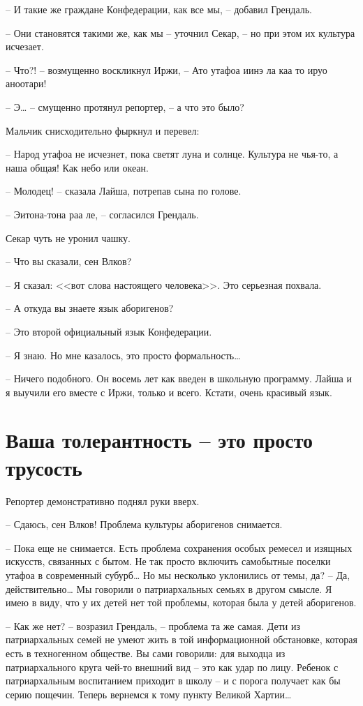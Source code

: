 -- И такие же граждане Конфедерации, как все мы, -- добавил Грендаль.

-- Они становятся такими же, как мы -- уточнил Секар, -- но при этом их культура исчезает.

-- Что?! -- возмущенно воскликнул Иржи, -- Ато утафоа иинэ ла каа то ируо аноотари!

-- Э\ldots{} -- смущенно протянул репортер, -- а что это было?

Мальчик снисходительно фыркнул и перевел:

-- Народ утафоа не исчезнет, пока светят луна и солнце. Культура не чья-то, а наша общая! Как небо или океан.

-- Молодец! -- сказала Лайша, потрепав сына по голове.

-- Эитона-тона раа ле, -- согласился Грендаль.

Секар чуть не уронил чашку.

-- Что вы сказали, сен Влков?

-- Я сказал: <<вот слова настоящего человека>>. Это серьезная похвала.

-- А откуда вы знаете язык аборигенов?

-- Это второй официальный язык Конфедерации.

-- Я знаю. Но мне казалось, это просто формальность\ldots{}

-- Ничего подобного. Он восемь лет как введен в школьную программу. Лайша и я выучили его вместе с Иржи, только и всего. Кстати, очень красивый язык.



\chapter{Ваша толерантность -- это просто трусость}


Репортер демонстративно поднял руки вверх.

-- Сдаюсь, сен Влков! Проблема культуры аборигенов снимается.

-- Пока еще не снимается. Есть проблема сохранения особых ремесел и изящных искусств, связанных с бытом. Не так просто включить самобытные поселки утафоа в современный субурб\ldots{} Но мы несколько уклонились от темы, да?
-- Да, действительно\ldots{} Мы говорили о патриархальных семьях в другом смысле. Я имею в виду, что у их детей нет той проблемы, которая была у детей аборигенов.

-- Как же нет? -- возразил Грендаль, -- проблема та же самая. Дети из патриархальных семей не умеют жить в той информационной обстановке, которая есть в техногенном обществе. Вы сами говорили: для выходца из патриархального круга чей-то внешний вид -- это как удар по лицу. Ребенок с патриархальным воспитанием приходит в школу -- и с порога получает как бы серию пощечин. Теперь вернемся к тому пункту Великой Хартии\ldots{}

